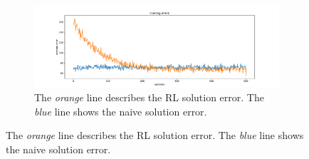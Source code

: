 \documentclass[conference]{IEEEtran}
\begin{document}
\begin{figure}
  \begin{subfigure}[b]{\textwidth}
    \centering
    \includegraphics[width=\textwidth]{img/mean-error}
    \caption{The \textit{orange} line 
    describes the RL solution error. The \textit{blue} line shows
    the naive solution error.}
    \hspace{5mm}
    \label{fig:simulation-a}
  \end{subfigure}
  

\end{figure}
\end{document}
